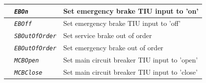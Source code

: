 \begin{itemize}
\begin{longtable}{|l|l|l|}
			\hline

			&	\begin{minipage}[t]{0.30\linewidth} \emph{\texttt{EBOn}} \end{minipage}
			&	\begin{minipage}[t]{0.38\linewidth} Set emergency brake TIU input to ’on’ \end{minipage} \\

			\hline

			&	\begin{minipage}[t]{0.30\linewidth} \emph{\texttt{EBOff}} \end{minipage}
			&	\begin{minipage}[t]{0.38\linewidth} Set emergency brake TIU input to ’off’ \end{minipage} \\

			\hline

			&	\begin{minipage}[t]{0.30\linewidth} \emph{\texttt{SBOutOfOrder}} \end{minipage}
			&	\begin{minipage}[t]{0.38\linewidth} Set service brake out of order \end{minipage} \\

			\hline

			&	\begin{minipage}[t]{0.30\linewidth} \emph{\texttt{EBOutOfOrder}} \end{minipage}
			&	\begin{minipage}[t]{0.38\linewidth} Set emergency brake out of order \end{minipage} \\

			\hline

			&	\begin{minipage}[t]{0.30\linewidth} \emph{\texttt{MCBOpen}} \end{minipage}
			&	\begin{minipage}[t]{0.38\linewidth} Set main circuit breaker TIU input to ’open’ \end{minipage} \\

			\hline

			&	\begin{minipage}[t]{0.30\linewidth} \emph{\texttt{MCBClose}} \end{minipage}
			&	\begin{minipage}[t]{0.38\linewidth} Set main circuit breaker TIU input to ’close’ \end{minipage} \\


\end{longtable}
\end{itemize}
